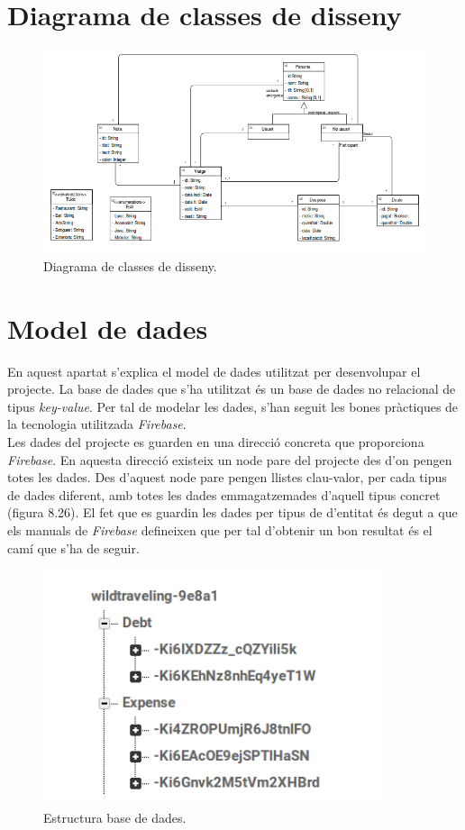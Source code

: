 \section{Diagrama de classes de disseny}

\begin{figure}[!h]
\centering
\includegraphics[scale=0.80]{Figures/classesDisseny.png}
\caption{Diagrama de classes de disseny.}
\end{figure}

\section{Model de dades}

En aquest apartat s'explica el model de dades utilitzat per desenvolupar el projecte. La base de dades que s'ha utilitzat és un base de dades no relacional de tipus \textit{key-value}. Per tal de modelar les dades, s'han seguit les bones pràctiques de la tecnologia utilitzada \textit{Firebase}.\\

Les dades del projecte es guarden en una direcció concreta que proporciona \textit{Firebase}. En aquesta direcció existeix un node pare del projecte des d'on pengen totes les dades. Des d'aquest node pare pengen llistes clau-valor, per cada tipus de dades diferent, amb totes les dades emmagatzemades d'aquell tipus concret (figura 8.26). El fet que es guardin les dades per tipus de d'entitat és degut a que els manuals de \textit{Firebase} defineixen que per tal d'obtenir un bon resultat és el camí que s'ha de seguir.

\begin{figure}[!h]
\centering
\includegraphics[scale=1.00]{Figures/EstructuraBD.jpg}
\caption{Estructura base de dades.}
\end{figure}


